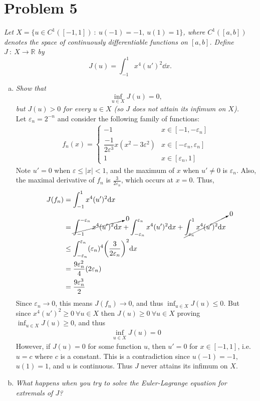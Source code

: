 \documentclass[12pt]{article}
\theoremstyle{plain}
\newcommand{\E}{\varepsilon}
\begin{document}
\section*{Problem 5}
\emph{Let $X = \{u \in C^1([-1,1])\ :\ u(-1) = -1,\ u(1) = 1\}$, where $C^1([a,b])$ denotes the space of continuously differentiable functions on $[a,b]$.  Define $J\ :\ X \rightarrow \mathbb{R}$ by $$J(u) = \int_{-1}^1 x^4 (u')^2 \dd x.$$}
\begin{enumerate}[(a)]
    \item \emph{Show that $$\inf_{u\in X}J(u) = 0,$$ but $J(u) > 0$ for every $u \in X$ (so $J$ does not attain its infimum on $X$).} \\

    Let $\E_n = 2^{-n}$ and consider the following family of functions:
    \begin{align*}
        f_n(x) = \begin{cases}
            -1 & x \in [-1, -\E_n] \\
            \dfrac{-1}{2\E^3}x(x^2 - 3\E^2) & x \in [-\E_n, \E_n] \\
            1 & x \in [\E_n, 1]
        \end{cases}
    \end{align*}
    Note $u' = 0$ when $\E \leq |x| < 1$, and the maximum of $x$ when $u' \neq 0$ is $\E_n$.  Also, the maximal derivative of $f_n$ is $\frac{3}{2\E_n}$, which occurs at $x = 0$.  Thus,
    \begin{align*}
        J(f_n) &= \int_{-1}^1 x^4 (u')^2 \dd x \\
        &= \cancelto{0}{\int_{-1}^{-\E_n} x^4 (u')^2 \dd x} + \int_{-\E_n}^{\E_n} x^4 (u')^2 \dd x + \cancelto{0}{\int_{\E_n}^1 x^4 (u')^2 \dd x} \\
        &\leq \int_{-\E_n}^{\E_n} (\E_n)^4\qty(\frac{3}{2\E_n})^2 \dd x \\
        &= \frac{9\E_n^2}{4}(2\E_n) \\
        &= \frac{9\E_n^3}{2}
    \end{align*}
    Since $\E_n \rightarrow 0$, this means $J(f_n) \rightarrow 0$, and thus $\inf_{u \in X}J(u) \leq 0$.  But since $x^4(u')^2 \geq 0\ \forall u \in X$ then $J(u) \geq 0\ \forall u \in X$ proving $\inf_{u \in X}J(u) \geq 0$, and thus
    \begin{align*}
        \inf_{u \in X}J(u) = 0
    \end{align*}
    However, if $J(u) = 0$ for some function $u$, then $u' = 0$ for $x \in [-1, 1]$, i.e.~$u = c$ where $c$ is a constant.  This is a contradiction since $u(-1) = -1$, $u(1) = 1$, and $u$ is continuous.  Thus $J$ never attains its infimum on $X$.
    \item \emph{What happens when you try to solve the Euler-Lagrange equation for extremals of $J$?} \\


\end{enumerate}
\end{document}
